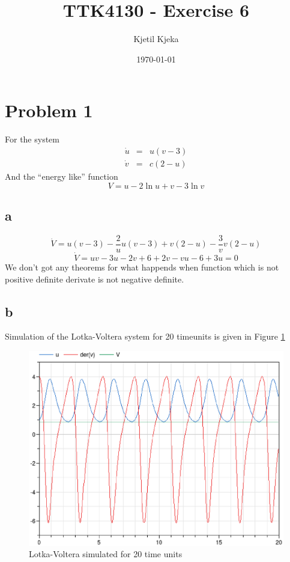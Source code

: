 \documentclass[11pt]{article}
\author{Kjetil Kjeka}
\title{TTK4130 - Exercise 6}
\date{\today}
\begin{document}
\maketitle
\section*{Problem 1}
For the system
\begin{eqnarray*}
\dot{u} &=& u (v-3) \\
\dot{v} &=& c (2-u)
\end{eqnarray*}
And the ``energy like'' function
\[V = u - 2 \ln{u} + v - 3 \ln{v} \]
\subsection*{a}
\[\dot{V} = u(v-3) - \frac{2}{u} u(v-3) + v(2-u) - \frac{3}{v} v(2-u) \]
\[\dot{V} = uv - 3u - 2v + 6 + 2v -vu - 6 + 3u = 0 \]
We don't got any theorems for what happends when function which is not positive definite derivate is not negative definite.

\subsection*{b}
Simulation of the Lotka-Voltera system for 20 timeunits is given in Figure \ref{fig:LotkaVoltera}
\begin{figure}[h!]
\centering
\includegraphics[width=.8\textwidth]{LotkaVoltera.eps}
\caption{Lotka-Voltera simulated for 20 time units}
\label{fig:LotkaVoltera}
\end{figure}
\end{document}
